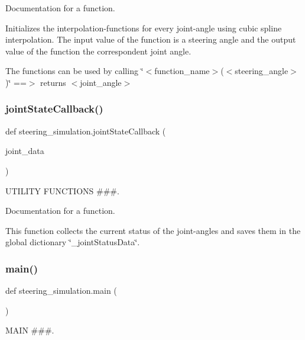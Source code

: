 Documentation for a function. 

Initializes the interpolation-\/functions for every joint-\/angle using cubic spline interpolation. The input value of the function is a steering angle and the output value of the function the correspondent joint angle.

The functions can be used by calling \char`\"{}$<$function\+\_\+name$>$($<$steering\+\_\+angle$>$)\char`\"{} ==$>$ returns $<$joint\+\_\+angle$>$ \mbox{\label{namespacesteering__simulation_a49d8e64bcd7d1221d6de01b9b22bb799}} 
\subsubsection{\texorpdfstring{jointStateCallback()}{jointStateCallback()}}
{\footnotesize\ttfamily def steering\+\_\+simulation.\+joint\+State\+Callback (\begin{DoxyParamCaption}\item[{}]{joint\+\_\+data }\end{DoxyParamCaption})}



U\+T\+I\+L\+I\+TY F\+U\+N\+C\+T\+I\+O\+NS \#\#\#. 

Documentation for a function.

This function collects the current status of the joint-\/angles and saves them in the global dictionary \char`\"{}\+\_\+joint\+Status\+Data\char`\"{}. \mbox{\label{namespacesteering__simulation_af3dec39cd8650ad512084dfda32c577a}} 
\subsubsection{\texorpdfstring{main()}{main()}}
{\footnotesize\ttfamily def steering\+\_\+simulation.\+main (\begin{DoxyParamCaption}{ }\end{DoxyParamCaption})}



M\+A\+IN \#\#\#. 

\mbox{\label{namespacesteering__simulation_aa303bfd6d5e874d19fda9e678aa4c3d9}} 
